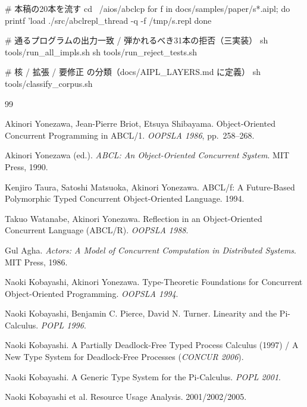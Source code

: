 \documentclass[11pt,a4paper]{ltjsarticle}
\theoremstyle{definition}
\theoremstyle{remark}
\begin{document}
\begin{term}
# 本稿の20本を流す
cd ~/aios/abclcp
for f in docs/samples/paper/s*.aipl; do
  printf 'load %
  ./src/abclrepl_thread -q -f /tmp/s.repl
done

# 通るプログラムの出力一致 / 弾かれるべき31本の拒否（三実装）
sh tools/run_all_impls.sh
sh tools/run_reject_tests.sh

# 核 / 拡張 / 要修正 の分類（docs/AIPL_LAYERS.md に定義）
sh tools/classify_corpus.sh
\end{term}

\begin{thebibliography}{99}

Akinori Yonezawa, Jean-Pierre Briot, Etsuya Shibayama.
\newblock Object-Oriented Concurrent Programming in ABCL/1.
\newblock \emph{OOPSLA 1986}, pp.~258--268.

Akinori Yonezawa (ed.).
\newblock \emph{ABCL: An Object-Oriented Concurrent System}. MIT Press, 1990.

Kenjiro Taura, Satoshi Matsuoka, Akinori Yonezawa.
\newblock ABCL/f: A Future-Based Polymorphic Typed Concurrent
Object-Oriented Language. 1994.

Takuo Watanabe, Akinori Yonezawa.
\newblock Reflection in an Object-Oriented Concurrent Language (ABCL/R).
\newblock \emph{OOPSLA 1988}.

Gul Agha.
\newblock \emph{Actors: A Model of Concurrent Computation in Distributed
Systems}. MIT Press, 1986.

Naoki Kobayashi, Akinori Yonezawa.
\newblock Type-Theoretic Foundations for Concurrent Object-Oriented Programming.
\newblock \emph{OOPSLA 1994}.

Naoki Kobayashi, Benjamin C. Pierce, David N. Turner.
\newblock Linearity and the Pi-Calculus. \emph{POPL 1996}.

Naoki Kobayashi.
\newblock A Partially Deadlock-Free Typed Process Calculus (1997) /
A New Type System for Deadlock-Free Processes (\emph{CONCUR 2006}).

Naoki Kobayashi.
\newblock A Generic Type System for the Pi-Calculus. \emph{POPL 2001}.

Naoki Kobayashi et al.
\newblock Resource Usage Analysis. 2001/2002/2005.


\end{thebibliography}
\end{document}
